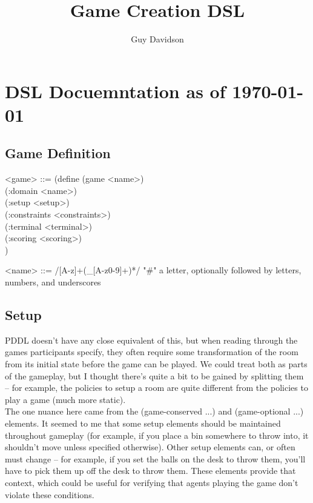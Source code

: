 \documentclass{article}
\title{Game Creation DSL}
\author{Guy Davidson}
\begin{document}
\maketitle

\section{DSL Docuemntation as of \today}\subsection{Game Definition}
\begin{grammar}
<game> ::= (define (game <name>) \\
  (:domain <name>) \\
  (:setup <setup>) \\
  (:constraints <constraints>) \\
  (:terminal <terminal>) \\
  (:scoring <scoring>) \\)

<name> ::= /[A-z]+(_[A-z0-9]+)*/ "#" a letter, optionally followed by letters, numbers, and underscores
\end{grammar}

\subsection{Setup}
PDDL doesn't have any close equivalent of this, but when reading through the games participants specify, 
        they often require some transformation of the room from its initial state before the game can be played.
        We could treat both as parts of the gameplay, but I thought there's quite a bit to be gained by splitting them -- for example,
        the policies to setup a room are quite different from the policies to play a game (much more static). \\

        The one nuance here came from the (game-conserved ...) and (game-optional ...) elements. It seemed to me that some setup elements should be maintained
        throughout gameplay (for example, if you place a bin somewhere to throw into, it shouldn't move unless specified otherwise).
        Other setup elements can, or often must change -- for example, if you set the balls on the desk to throw them, you'll have to pick them up off the desk to throw them.
        These elements provide that context, which could be useful for verifying that agents playing the game don't violate these conditions.
        
\end{document}
